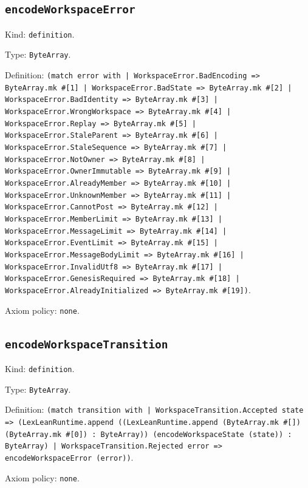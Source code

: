 \documentclass[11pt]{article}
\begin{document}
\subsection*{\texttt{encodeWorkspaceError}}
\noindent Kind: \texttt{definition}.\par
\noindent Type: \texttt{ByteArray}.\par
\noindent Definition: \texttt{(match error with | WorkspaceError.BadEncoding => ByteArray.mk \#[1] | WorkspaceError.BadState => ByteArray.mk \#[2] | WorkspaceError.BadIdentity => ByteArray.mk \#[3] | WorkspaceError.WrongWorkspace => ByteArray.mk \#[4] | WorkspaceError.Replay => ByteArray.mk \#[5] | WorkspaceError.StaleParent => ByteArray.mk \#[6] | WorkspaceError.StaleSequence => ByteArray.mk \#[7] | WorkspaceError.NotOwner => ByteArray.mk \#[8] | WorkspaceError.OwnerImmutable => ByteArray.mk \#[9] | WorkspaceError.AlreadyMember => ByteArray.mk \#[10] | WorkspaceError.UnknownMember => ByteArray.mk \#[11] | WorkspaceError.CannotPost => ByteArray.mk \#[12] | WorkspaceError.MemberLimit => ByteArray.mk \#[13] | WorkspaceError.MessageLimit => ByteArray.mk \#[14] | WorkspaceError.EventLimit => ByteArray.mk \#[15] | WorkspaceError.MessageBodyLimit => ByteArray.mk \#[16] | WorkspaceError.InvalidUtf8 => ByteArray.mk \#[17] | WorkspaceError.GenesisRequired => ByteArray.mk \#[18] | WorkspaceError.AlreadyInitialized => ByteArray.mk \#[19])}.\par
\noindent Axiom policy: \texttt{none}.\par
\subsection*{\texttt{encodeWorkspaceTransition}}
\noindent Kind: \texttt{definition}.\par
\noindent Type: \texttt{ByteArray}.\par
\noindent Definition: \texttt{(match transition with | WorkspaceTransition.Accepted state => (LexLeanRuntime.append ((LexLeanRuntime.append (ByteArray.mk \#[]) (ByteArray.mk \#[0]) : ByteArray)) (encodeWorkspaceState (state)) : ByteArray) | WorkspaceTransition.Rejected error => encodeWorkspaceError (error))}.\par
\noindent Axiom policy: \texttt{none}.\par
\end{document}
